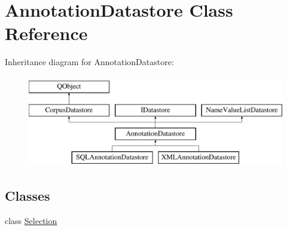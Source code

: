 \hypertarget{class_annotation_datastore}{}\section{Annotation\+Datastore Class Reference}
\label{class_annotation_datastore}
Inheritance diagram for Annotation\+Datastore\+:\begin{figure}[H]
\begin{center}
\leavevmode
\includegraphics[height=4.000000cm]{class_annotation_datastore}
\end{center}
\end{figure}
\subsection*{Classes}
\begin{DoxyCompactItemize}
\item 
class \hyperlink{class_annotation_datastore_1_1_selection}{Selection}
\end{DoxyCompactItemize}
